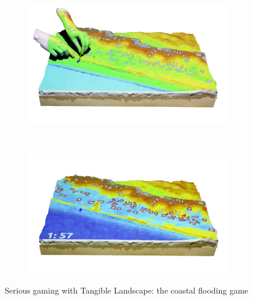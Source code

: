 \documentclass{article}
\begin{document}
\begin{figure}
\begin{subfigure}[t]{0.225\textwidth}
        \end{subfigure}
        ~ %
        \begin{subfigure}[t]{0.225\textwidth}
                \includegraphics[trim={0 0 0 1cm},clip,width=\textwidth]{tl_coastal_3s.png}
        \end{subfigure}
        ~ %
        \begin{subfigure}[t]{0.225\textwidth}
                \includegraphics[trim={0 0 0 1cm},clip,width=\textwidth]{tl_coastal_4s.png}
        \end{subfigure}
        \caption{Serious gaming with Tangible Landscape: the coastal flooding game}
        \label{fig:coastal_game}
\end{figure}

\end{document}
